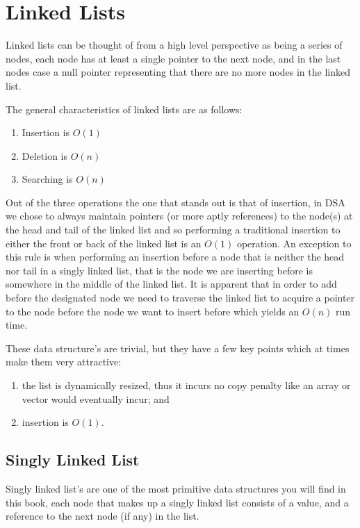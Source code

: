 \chapter{Linked Lists}
Linked lists can be thought of from a high level perspective as being a series of nodes, each node has at least a single pointer to the next node, and in the last nodes case a null pointer representing that there are no more nodes in the linked list.

The general characteristics of linked lists are as follows:

\begin{enumerate}
\item Insertion is $O(1)$
\item Deletion is $O(n)$
\item Searching is $O(n)$
\end{enumerate}

Out of the three operations the one that stands out is that of insertion, in DSA we chose to always maintain pointers (or more aptly references) to the node(s) at the head and tail of the linked list and so performing a traditional insertion to either the front or back of the linked list is an $O(1)$ operation. An exception to this rule is when performing an insertion before a node that is neither the head nor tail in a singly linked list, that is the node we are inserting before is somewhere in the middle of the linked list. It is apparent that in order to add before the designated node we need to traverse the linked list to acquire a pointer to the node before the node we want to insert before which yields an $O(n)$ run time.

These data structure's are trivial, but they have a few key points which at times make them very attractive: 
\begin{enumerate}
\item the list is dynamically resized, thus it incurs no copy penalty like an array or vector would eventually incur; and
\item insertion is $O(1)$.
\end{enumerate}

\section{Singly Linked List} \label{singly_linked_list}
Singly linked list's are one of the most primitive data structures you will find in this book, each node that makes up a singly linked list consists of a value, and a reference to the next node (if any) in the list. 

